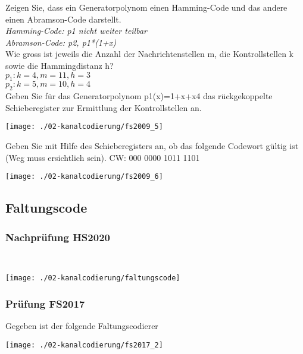 Zeigen Sie, dass ein Generatorpolynom einen Hamming-Code und das andere einen Abramson-Code darstellt.\\
\textit{Hamming-Code: p1 nicht weiter teilbar}\\
\textit{Abramson-Code: p2, p1*(1+x)}\\

Wie gross ist jeweils die Anzahl der Nachrichtenstellen m, die Kontrollstellen k sowie die Hammingdistanz h?\\
$p_1: k=4, m=11, h=3$\\
$p_2: k=5, m=10, h=4$\\

Geben Sie für das Generatorpolynom p1(x)=1+x+x4 das rückgekoppelte Schieberegister zur Ermittlung der Kontrollstellen an.
\begin{center}
    \vspace{-8pt}
    \texttt{[image: ./02-kanalcodierung/fs2009\_5]}
    \vspace{-8pt}
\end{center}

Geben Sie mit Hilfe des Schieberegisters an, ob das folgende Codewort gültig ist (Weg muss ersichtlich sein). CW: 000 0000 1011 1101
\begin{center}
    \vspace{-8pt}
    \texttt{[image: ./02-kanalcodierung/fs2009\_6]}
    \vspace{-8pt}
\end{center}

\subsection{Faltungscode}
\subsubsection{Nachprüfung HS2020}\mbox{}\\
\begin{center}
    \vspace{-8pt}
    \texttt{[image: ./02-kanalcodierung/faltungscode]}
    \vspace{-8pt}
\end{center}

\subsubsection{Prüfung FS2017}
Gegeben ist der folgende Faltungscodierer
\begin{center}
    \vspace{-8pt}
    \texttt{[image: ./02-kanalcodierung/fs2017\_2]}
    \vspace{-8pt}
\end{center}

